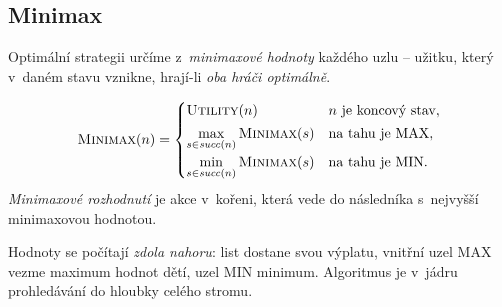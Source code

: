 \subsection{Minimax}

Optimální strategii určíme z~\emph{minimaxové hodnoty} každého uzlu -- užitku, který v~daném stavu vznikne, hrají-li \emph{oba hráči optimálně}.

\begin{definice}
\[
\textsc{Minimax}(n)=
\begin{cases}
\textsc{Utility}(n) & n \text{ je koncový stav},\\[2pt]
\displaystyle\max_{s\in\mathit{succ}(n)} \textsc{Minimax}(s) & \text{na tahu je MAX},\\[6pt]
\displaystyle\min_{s\in\mathit{succ}(n)} \textsc{Minimax}(s) & \text{na tahu je MIN}.
\end{cases}
\]
\emph{Minimaxové rozhodnutí} je akce v~kořeni, která vede do následníka s~nejvyšší minimaxovou hodnotou.
\end{definice}

Hodnoty se počítají \emph{zdola nahoru}: list dostane svou výplatu, vnitřní uzel MAX vezme maximum hodnot dětí, uzel MIN minimum. Algoritmus je v~jádru prohledávání do hloubky celého stromu.

